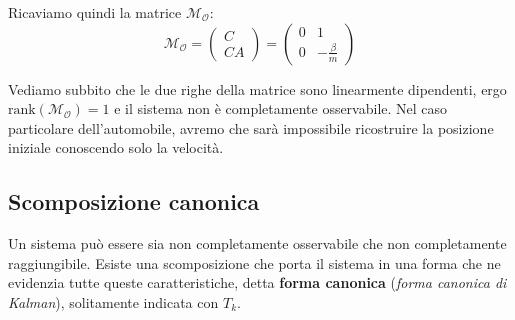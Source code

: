\documentclass[a4paper,11pt]{article}
\begin{document}
Ricaviamo quindi la matrice $\mathcal{M}_\mathcal{O}$:
$$
\mathcal{M}_\mathcal{O} = \begin{pmatrix}
 C \\ C A
\end{pmatrix} = \begin{pmatrix}
	0 & 1 \\
	0 & -\frac{\beta}{m}
\end{pmatrix}
$$

Vediamo subbito che le due righe della matrice sono linearmente dipendenti, ergo $\mathrm{rank}(\mathcal{M}_\mathcal{O}) = 1$ e il sistema non è completamente osservabile.
Nel caso particolare dell'automobile, avremo che sarà impossibile ricostruire la posizione iniziale conoscendo solo la velocità.

\subsection{Scomposizione canonica}
Un sistema può essere sia non completamente osservabile che non completamente raggiungibile.
Esiste una scomposizione che porta il sistema in una forma che ne evidenzia tutte queste caratteristiche, detta \textbf{forma canonica} (\textit{forma canonica di Kalman}), solitamente indicata con $T_k$.
\end{document}
